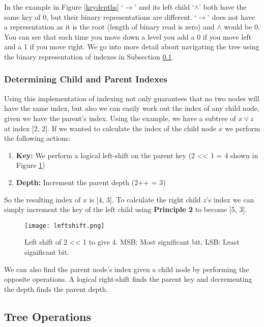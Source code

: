 \documentclass[draft]{report}
\begin{document}
In the example in Figure \ref{keydepths} `$\rightarrow$' and its left child `$\land$' both have the same key of 0, but their binary representations are different. `$\rightarrow$' does not have a representation as it is the root (length of binary read is zero) and $\land$ would be 0. You can see that each time you move down a level you add a 0 if you move left and a 1 if you move right. We go into more detail about navigating the tree using the binary representation of indexes in Subsection \ref{sub:tree_operations}.

\subsubsection{Determining Child and Parent Indexes}

Using this implementation of indexing not only guarantees that no two nodes will have the same index, but also we can easily work out the index of any child node, given we have the parent's index. Using the example, we have a subtree of $x\lor z$ at index [2, 2]. If we wanted to calculate the index of the child node $x$ we perform the following actions:

\begin{enumerate}
    \item \textbf{Key:} We perform a logical left-shift on the parent key (2 << 1 = 4 shown in Figure \ref{leftshift})
    \item \textbf{Depth:} Increment the parent depth (2++ = 3)
\end{enumerate}

So the resulting index of $x$ is [4, 3]. To calculate the right child $z$'s index we can simply increment the key of the left child using \textbf{Principle 2} to become [5, 3].

\begin{figure}[ht]
    \centering
    \texttt{[image: leftshift.png]}
    \caption{Left shift of 2 << 1 to give 4. MSB: Most significant bit, LSB: Least significant bit.}
    \label{leftshift}
\end{figure}

We can also find the parent node's index given a child node by performing the opposite operations. A logical right-shift finds the parent key and decrementing the depth finds the parent depth.

\subsection{Tree Operations}
\label{sub:tree_operations}
\end{document}
